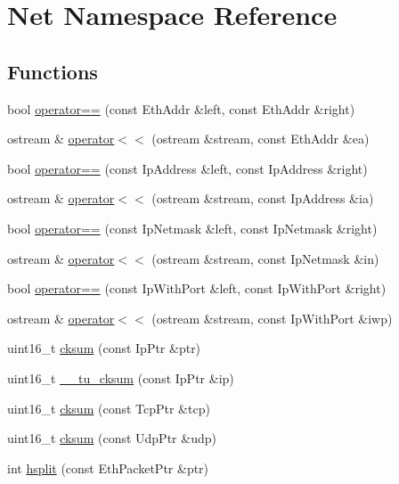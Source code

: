 \hypertarget{namespaceNet}{
\section{Net Namespace Reference}
\label{namespaceNet}
}
\subsection*{Functions}
\begin{DoxyCompactItemize}
\item 
bool \hyperlink{namespaceNet_a4b92de0ee07f219e85e35c312222cd0d}{operator==} (const EthAddr \&left, const EthAddr \&right)
\item 
ostream \& \hyperlink{namespaceNet_a6ee6ae0fe485e2f01a9b42ab77329d7d}{operator$<$$<$} (ostream \&stream, const EthAddr \&ea)
\item 
bool \hyperlink{namespaceNet_a6bfbfd9938a1a16b23a8f1643757b6bf}{operator==} (const IpAddress \&left, const IpAddress \&right)
\item 
ostream \& \hyperlink{namespaceNet_a375cbbb01685429061c5da6797bdfcf5}{operator$<$$<$} (ostream \&stream, const IpAddress \&ia)
\item 
bool \hyperlink{namespaceNet_aa01345ac21b16ed1d6d439732a4c366e}{operator==} (const IpNetmask \&left, const IpNetmask \&right)
\item 
ostream \& \hyperlink{namespaceNet_ac5d1eaf544b16bb39dbcf35cf2630b24}{operator$<$$<$} (ostream \&stream, const IpNetmask \&in)
\item 
bool \hyperlink{namespaceNet_a4fb587c01e10364c1d27edbd958fc92d}{operator==} (const IpWithPort \&left, const IpWithPort \&right)
\item 
ostream \& \hyperlink{namespaceNet_a0e836533fd8b6ae417355a2122f2f48c}{operator$<$$<$} (ostream \&stream, const IpWithPort \&iwp)
\item 
uint16\_\-t \hyperlink{namespaceNet_a5ec87e377d6c9fd11933ed008df58af2}{cksum} (const IpPtr \&ptr)
\item 
uint16\_\-t \hyperlink{namespaceNet_ae251828c44688309e4fb244bc10ebc97}{\_\-\_\-tu\_\-cksum} (const IpPtr \&ip)
\item 
uint16\_\-t \hyperlink{namespaceNet_ac84753b54a83d2be58b29ad2e9aa0fa4}{cksum} (const TcpPtr \&tcp)
\item 
uint16\_\-t \hyperlink{namespaceNet_a93ab2a596dafaf0f685a65a2ee68c91e}{cksum} (const UdpPtr \&udp)
\item 
int \hyperlink{namespaceNet_a7e50a230aeed27f50f5dd05a5768c74c}{hsplit} (const EthPacketPtr \&ptr)
\end{DoxyCompactItemize}


